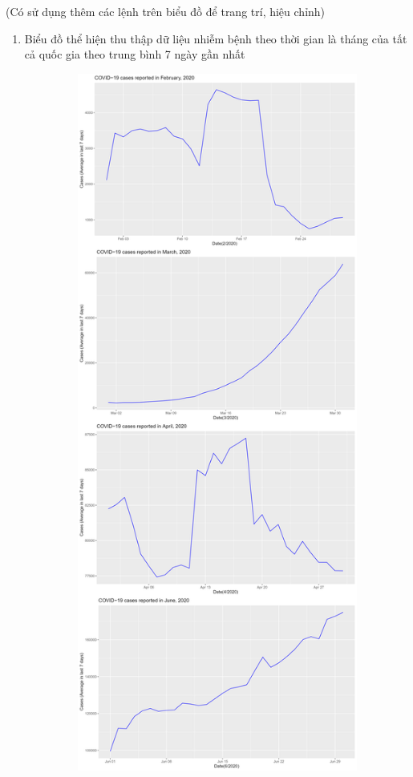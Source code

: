 \documentclass[a4paper]{article}
\theoremstyle{definition}
\begin{document}
\begin{enumerate}[i)]
        (Có sử dụng thêm các lệnh trên biểu đồ để trang trí, hiệu chỉnh)
		\begin{enumerate}[1)]
			\item Biểu đồ thể hiện thu thập dữ liệu nhiễm bệnh theo thời gian là tháng của tất cả quốc gia theo trung bình 7 ngày gần nhất
			\begin{figure}[H]
				\centering
				\includegraphics[height=23cm,width=13cm]{images/8.1.1.png}
			\end{figure}
			\begin{figure}[H]

\end{figure}
\end{enumerate}
\end{enumerate}
\end{document}
